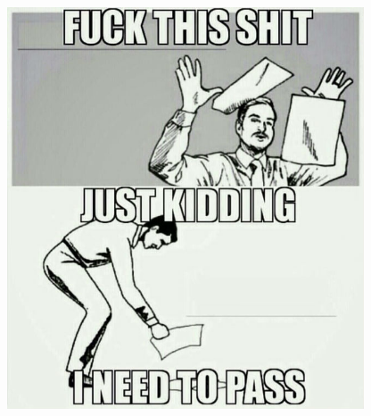 \documentclass[]{book}
\theoremstyle{definition}
\theoremstyle{definition}
\theoremstyle{remark}
\begin{document}
\begin{figure}

{\centering \includegraphics[width=400px]{images/fuckexam} 

}

\end{figure}
\end{document}
